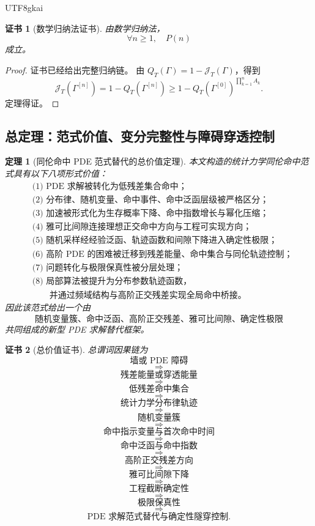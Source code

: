 \documentclass[12pt]{article}
\newtheorem{theorem}{定理}[section]
\newtheorem{Certificate}{证书}[section]
\begin{document}
\begin{CJK*}{UTF8}{gkai}
\begin{Certificate}[数学归纳法证书]
由数学归纳法，
\[
  \forall n\ge1,\quad P(n)
\]
成立。
\end{Certificate}

\begin{proof}
证书已经给出完整归纳链。
由 \(Q_T(\Gamma)=1-\mathcal J_T(\Gamma)\)，得到
\[
  \mathcal J_T(\Gamma^{[n]})
  =
  1-Q_T(\Gamma^{[n]})
  \ge
  1-
  Q_T(\Gamma^{[0]})^{\prod_{k=1}^{n}A_k}.
\]
定理得证。
\end{proof}

\subsection{总定理：范式价值、变分完整性与障碍穿透控制}
\label{subsec:tex55-value-variational-tunnel-final-theorem}

\begin{theorem}[同伦命中 PDE 范式替代的总价值定理]
\label{thm:tex55-total-value-variational-tunnel}
本文构造的统计力学同伦命中范式具有以下八项形式价值：
\[
\begin{aligned}
  &\text{(1) PDE 求解被转化为低残差集合命中；}\\
  &\text{(2) 分布律、随机变量、命中事件、命中泛函层级被严格区分；}\\
  &\text{(3) 加速被形式化为生存概率下降、命中指数增长与幂化压缩；}\\
  &\text{(4) 雅可比间隙连接理想正交命中方向与工程可实现方向；}\\
  &\text{(5) 随机采样经经验泛函、轨迹函数和间隙下降进入确定性极限；}\\
  &\text{(6) 高阶 PDE 的困难被迁移到残差能量、命中集合与同伦轨迹控制；}\\
  &\text{(7) 问题转化与极限保真性被分层处理；}\\
  &\text{(8) 局部算法被提升为分布参数轨迹函数，}\\
  &\qquad\text{并通过频域结构与高阶正交残差实现全局命中桥接。}
\end{aligned}
\]
因此该范式给出一个由
\[
  \boxed{
  \text{随机变量簇、命中泛函、高阶正交残差、雅可比间隙、确定性极限}
  }
\]
共同组成的新型 PDE 求解替代框架。
\end{theorem}

\begin{Certificate}[总价值证书]
\label{cert:tex55-total-value-variational-tunnel}
总谓词因果链为
\[
  \text{墙或 PDE 障碍}
\]
\[
  \Longrightarrow
\]
\[
  \text{残差能量或穿透能量}
\]
\[
  \Longrightarrow
\]
\[
  \text{低残差命中集合}
\]
\[
  \Longrightarrow
\]
\[
  \text{统计力学分布律轨迹}
\]
\[
  \Longrightarrow
\]
\[
  \text{随机变量簇}
\]
\[
  \Longrightarrow
\]
\[
  \text{命中指示变量与首次命中时间}
\]
\[
  \Longrightarrow
\]
\[
  \text{命中泛函与命中指数}
\]
\[
  \Longrightarrow
\]
\[
  \text{高阶正交残差方向}
\]
\[
  \Longrightarrow
\]
\[
  \text{雅可比间隙下降}
\]
\[
  \Longrightarrow
\]
\[
  \text{工程截断确定性}
\]
\[
  \Longrightarrow
\]
\[
  \text{极限保真性}
\]
\[
  \Longrightarrow
\]
\[
  \text{PDE 求解范式替代与确定性隧穿控制}.
\]
\end{Certificate}


\end{CJK*}
\end{document}
